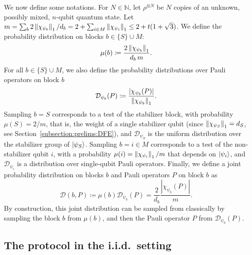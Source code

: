 \documentclass[a4paper,twocolumn,11pt,unpublished]{../../revision/quantumarticle}
\newcommand{\np}{m}
\newcommand{\pdist}{\mathcal D} %
\begin{document}
            We now define some notations.
            For
            $N\in\mathbb
            N$, let $\rho^{\otimes N}$ be $N$ copies of an unknown, possibly mixed, $n$-qubit quantum state.
            Let $\np=\sum_b 2\norm{\chi_{\psi_b}}_1/d_b=2+\sum_{i\in M}\norm{\chi_{\psi_i}}_1\le 2+t(1+\sqrt3)$. We define the probability distribution on blocks $b\in\{S\}\cup M$:
            \begin{equation}
            \label{mu_i}
                \mu(b) \coloneqq \frac{2\norm{\chi_{\psi_b}}_1}{d_b\,\np}.
            \end{equation}
            For all $b\in\{S\}\cup M$, we also define the probability distributions over Pauli operators on block $b$
            \begin{equation}
            \label{Dpsi_iP}
                \mathcal{D}_{\psi_b}(P) \coloneqq \frac{|\chi_{\psi_b}(P)|}{\left\lVert\chi_{\psi_b}\right\rVert_1}.
            \end{equation}
            Sampling $b=S$ corresponds to a test of the stabilizer block, with probability $\mu(S)=2/\np$, that is, the weight of a single stabilizer qubit (since $\left\lVert\chi_{\psi_S}\right\rVert_1=d_S$, see Section~\ref{subsection:prelims:DFE}), and $\mathcal{D}_{\psi_S}$ is the uniform distribution over the stabilizer group of $\ket{\psi_S}$. Sampling $b=i\in M$ corresponds to a test of the non-stabilizer qubit $i$, with a probability $\mu(i)=\norm{\chi_{\psi_i}}_1/\np$ that depends on $\ket{\psi_i}$, and $\mathcal{D}_{\psi_i}$ is a distribution over single-qubit Pauli operators.
             Finally, we define a joint probability distribution on blocks $b$ and Pauli operators $P$ on block $b$ as
             \begin{equation}
            \label{DpsiPi}
                \pdist(b, P) \coloneqq \mu(b)\pdist_{\psi_b}(P)=\frac{2}{d_b}\frac{|\chi_{\psi_b}(P)|}{\np}.
            \end{equation}
            By construction, this joint distribution can be sampled from classically by sampling the block $b$ from $\mu(b)$, and then the Pauli operator $P$ from $\mathcal{D}_{\psi_b}(P)$.



            
\subsection{The protocol in the i.i.d.\ setting}
\label{subsection:iid}
%
%
%
%
%
\end{document}
